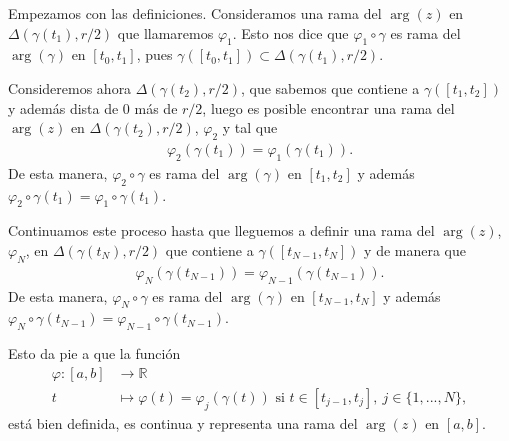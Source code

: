 Empezamos con las definiciones. Consideramos una rama del $\arg(z)$ en $\Delta(\gamma(t_1), r/2)$ que llamaremos $\varphi_1$. Esto nos dice que $\varphi_1 \circ \gamma$ es rama del $\arg(\gamma)$ en $[t_0, t_1]$, pues $\gamma([t_0,t_1]) \subset \Delta(\gamma(t_1), r/2)$.

Consideremos ahora $\Delta(\gamma(t_2), r/2)$, que sabemos que contiene a $\gamma([t_1,t_2])$ y además dista de $0$ más de $r/2$, luego es posible encontrar una rama del $\arg(z)$ en $\Delta(\gamma(t_2), r/2)$, $\varphi_2$ y tal que
\begin{align*}
    \varphi_2 (\gamma(t_1)) = \varphi_1(\gamma(t_1)).
\end{align*}
De esta manera, $\varphi_2 \circ \gamma$ es rama del $\arg(\gamma)$ en $[t_1,t_2]$ y además $\varphi_2 \circ \gamma (t_1) = \varphi_1 \circ \gamma (t_1)$.

Continuamos este proceso hasta que lleguemos a definir una rama del $\arg(z)$, $\varphi_N$, en $\Delta(\gamma(t_N), r/2)$ que contiene a $\gamma([t_{N-1},t_N])$ y de manera que
\begin{align*}
    \varphi_N (\gamma(t_{N-1})) = \varphi_{N-1}(\gamma(t_{N-1})).
\end{align*}
De esta manera, $\varphi_N \circ \gamma$ es rama del $\arg(\gamma)$ en $[t_{N-1},t_N]$ y además $\varphi_N \circ \gamma (t_{N-1}) = \varphi_{N-1} \circ \gamma (t_{N-1})$.

Esto da pie a que la función
\begin{align*}
    \varphi : [a,b] & \longrightarrow \mathbb{R}                                                                          \\
    t               & \longmapsto \varphi(t) = \varphi_j(\gamma(t)) \text{ si } t \in [t_{j-1},t_j], \ j \in \{1,...,N\},
\end{align*}
está bien definida, es continua y representa una rama del $\arg(z)$ en $[a,b]$.

